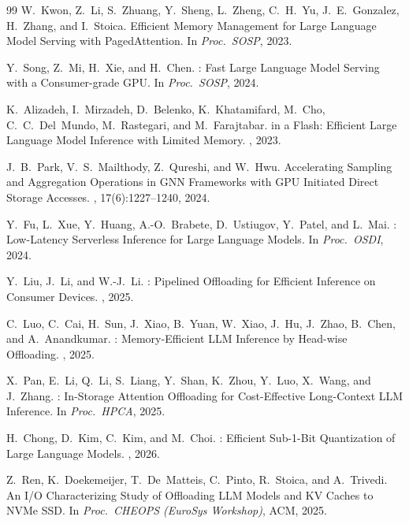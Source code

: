 \documentclass{article}
\begin{document}
\begin{thebibliography}{99}
W.~Kwon, Z.~Li, S.~Zhuang, Y.~Sheng, L.~Zheng, C.~H.~Yu,
J.~E.~Gonzalez, H.~Zhang, and I.~Stoica.
\newblock Efficient Memory Management for Large Language Model Serving with
  {PagedAttention}.
\newblock In {\em Proc.\ SOSP}, 2023.

Y.~Song, Z.~Mi, H.~Xie, and H.~Chen.
: Fast Large Language Model Serving with a Consumer-grade
  {GPU}.
\newblock In {\em Proc.\ SOSP}, 2024.

K.~Alizadeh, I.~Mirzadeh, D.~Belenko, K.~Khatamifard, M.~Cho,
C.~C.~Del~Mundo, M.~Rastegari, and M.~Farajtabar.
 in a Flash: Efficient Large Language Model Inference with
  Limited Memory.
, 2023.

J.~B.~Park, V.~S.~Mailthody, Z.~Qureshi, and W.~Hwu.
\newblock Accelerating Sampling and Aggregation Operations in {GNN} Frameworks
  with {GPU} Initiated Direct Storage Accesses.
, 17(6):1227--1240, 2024.

Y.~Fu, L.~Xue, Y.~Huang, A.-O.~Brabete, D.~Ustiugov, Y.~Patel, and L.~Mai.
: Low-Latency Serverless Inference for Large Language
  Models.
\newblock In {\em Proc.\ OSDI}, 2024.

Y.~Liu, J.~Li, and W.-J.~Li.
: Pipelined Offloading for Efficient Inference on Consumer
  Devices.
, 2025.

C.~Luo, C.~Cai, H.~Sun, J.~Xiao, B.~Yuan, W.~Xiao, J.~Hu, J.~Zhao,
B.~Chen, and A.~Anandkumar.
: Memory-Efficient {LLM} Inference by Head-wise
  Offloading.
, 2025.

X.~Pan, E.~Li, Q.~Li, S.~Liang, Y.~Shan, K.~Zhou, Y.~Luo, X.~Wang,
and J.~Zhang.
: In-Storage Attention Offloading for Cost-Effective
  Long-Context {LLM} Inference.
\newblock In {\em Proc.\ HPCA}, 2025.

H.~Chong, D.~Kim, C.~Kim, and M.~Choi.
: Efficient Sub-1-Bit Quantization of Large Language
  Models.
, 2026.

Z.~Ren, K.~Doekemeijer, T.~De~Matteis, C.~Pinto, R.~Stoica, and A.~Trivedi.
\newblock An {I/O} Characterizing Study of Offloading {LLM} Models and {KV}
  Caches to {NVMe} {SSD}.
\newblock In {\em Proc.\ CHEOPS (EuroSys Workshop)}, ACM, 2025.


\end{thebibliography}
\end{document}
